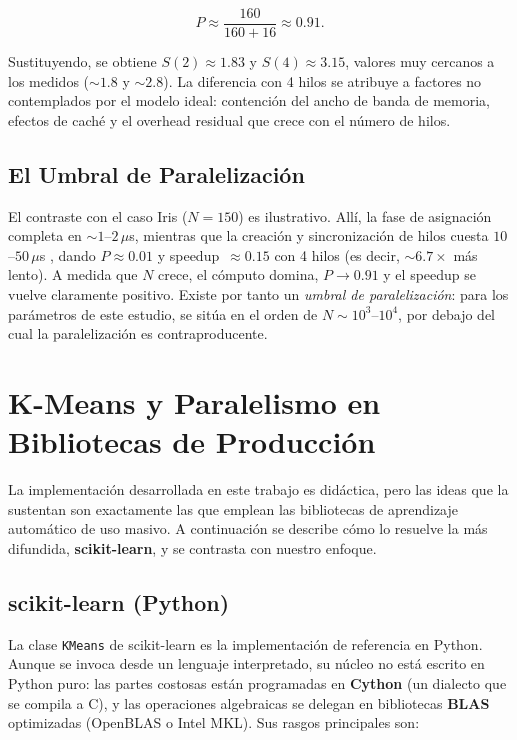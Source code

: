\documentclass[conference]{IEEEtran}
\begin{document}
\begin{equation}
  P \approx \frac{160}{160 + 16} \approx 0.91.
\end{equation}

Sustituyendo, se obtiene $S(2) \approx 1.83$ y $S(4) \approx 3.15$, valores
muy cercanos a los medidos ($\sim 1.8$ y $\sim 2.8$).
La diferencia con 4 hilos se atribuye a factores no contemplados por el modelo
ideal: contenci\'on del ancho de banda de memoria, efectos de cach\'e y el
overhead residual que crece con el n\'umero de hilos.

\subsection{El Umbral de Paralelizaci\'on}

El contraste con el caso Iris ($N{=}150$) es ilustrativo.
All\'i, la fase de asignaci\'on completa en $\sim 1$--$2\,\mu$s, mientras que
la creaci\'on y sincronizaci\'on de hilos cuesta $10$--$50\,\mu$s
\cite{chandra2001}, dando $P \approx 0.01$ y speedup~$\approx 0.15$ con 4
hilos (es decir, $\sim 6.7\times$ m\'as lento).
A medida que $N$ crece, el c\'omputo domina, $P \to 0.91$ y el speedup se
vuelve claramente positivo.
Existe por tanto un \emph{umbral de paralelizaci\'on}: para los par\'ametros
de este estudio, se sit\'ua en el orden de $N \sim 10^3$--$10^4$, por debajo
del cual la paralelizaci\'on es contraproducente.

\section{K-Means y Paralelismo en Bibliotecas de Producci\'on}
\label{sec:bibliotecas}

La implementaci\'on desarrollada en este trabajo es did\'actica, pero las ideas
que la sustentan son exactamente las que emplean las bibliotecas de aprendizaje
autom\'atico de uso masivo. A continuaci\'on se describe c\'omo lo resuelve la
m\'as difundida, \textbf{scikit-learn}, y se contrasta con nuestro enfoque.

\subsection{scikit-learn (Python)}

La clase \texttt{KMeans} de scikit-learn \cite{pedregosa2011} es la
implementaci\'on de referencia en Python. Aunque se invoca desde un lenguaje
interpretado, su n\'ucleo no est\'a escrito en Python puro: las partes costosas
est\'an programadas en \textbf{Cython} (un dialecto que se compila a C), y las
operaciones algebraicas se delegan en bibliotecas \textbf{BLAS} optimizadas
(OpenBLAS o Intel MKL). Sus rasgos principales son:
\end{document}
